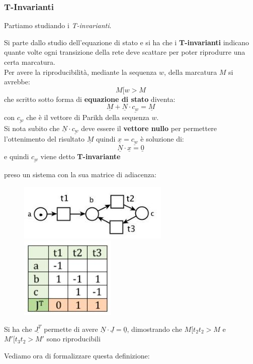 \documentclass[a4paper,12pt, oneside]{book}
\begin{document}
\subsubsection{T-Invarianti}
Partiamo studiando i \textit{T-invarianti}.
\begin{definizione}
  Si parte dallo studio dell'equazione di stato e si ha che i
  \textbf{T-invarianti} indicano quante volte ogni transizione della rete deve
  scattare per poter riprodurre una certa marcatura.\\
  Per avere la riproducibilità, mediante la sequenza
  $w$, della marcatura $M$ si avrebbe:
  \[M[w>M\]
  che scritto sotto forma di \textbf{equazione di stato} diventa:
  \[\underline{M}+\underline{N}\cdot\underline{c_w}=\underline{M}\]
  con $\underline{c_w}$ che è il vettore di Parikh della sequenza $w$.\\
  Si nota subito che $\underline{N}\cdot\underline{c_w}$ deve essere il
  \textbf{vettore nullo} per permettere l'ottenimento del risultato
  $\underline{M}$ quindi $\underline{x}=\underline{c_w}$ è soluzione di:
  \[\underline{N}\cdot\underline{x}=\underline{0}\]
  e quindi $\underline{c_w}$ viene detto \textbf{T-invariante}
  \begin{esempio}
    preso un sistema con la sua matrice di adiacenza:
    \begin{figure}[H]
      \centering
      \includegraphics[scale = 0.6]{img/ti.jpg}
      \centering
      \includegraphics[scale = 0.5]{img/t2.jpg}
    \end{figure}
    Si ha che $\underline{J^T}$ permette di avere $\underline{N}\cdot
    \underline{J}=\underline{0}$, dimostrando che $M[t_2t_2>M$ e
    $M'[t_3t_2>M'$ sono riproducibili
  \end{esempio}
\end{definizione}
Vediamo ora di formalizzare questa definizione:
\end{document}
